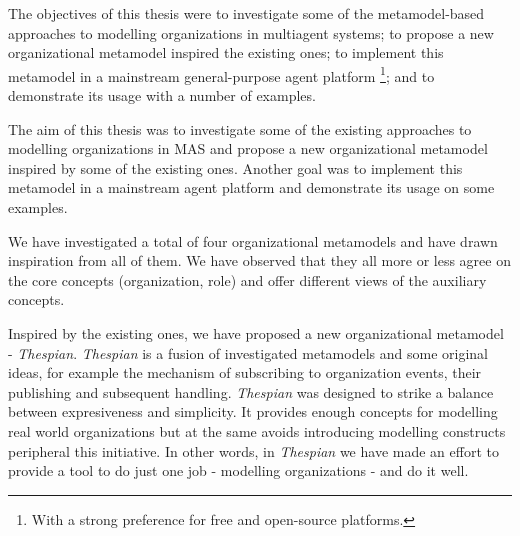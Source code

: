 


The objectives of this thesis were to investigate some of the metamodel-based approaches to modelling organizations in multiagent systems; to propose a new organizational metamodel inspired the existing ones; to implement this metamodel in a mainstream general-purpose agent platform
\footnote{With a strong preference for free and open-source platforms.}; and to demonstrate its usage with a number of examples. 

The aim of this thesis was to investigate some of the existing approaches to modelling organizations in MAS and propose a new organizational metamodel inspired by some of the existing ones.
Another goal was to implement this metamodel in a mainstream agent platform and demonstrate its usage on some examples.

We have investigated a total of four organizational metamodels and have drawn inspiration from all of them.
We have observed that they all more or less agree on the core concepts (organization, role) and offer different views of the auxiliary concepts.

Inspired by the existing ones, we have proposed a new organizational metamodel - \textit{Thespian}.
\textit{Thespian} is a fusion of investigated metamodels and some original ideas, for example the mechanism of subscribing to organization events, their publishing and subsequent handling.
\textit{Thespian} was designed to strike a balance between expresiveness and simplicity.
It provides enough concepts for modelling real world organizations but at the same avoids introducing modelling constructs peripheral this initiative.
In other words, in \textit{Thespian} we have made an effort to provide a tool to do just one job - modelling organizations - and do it well.

